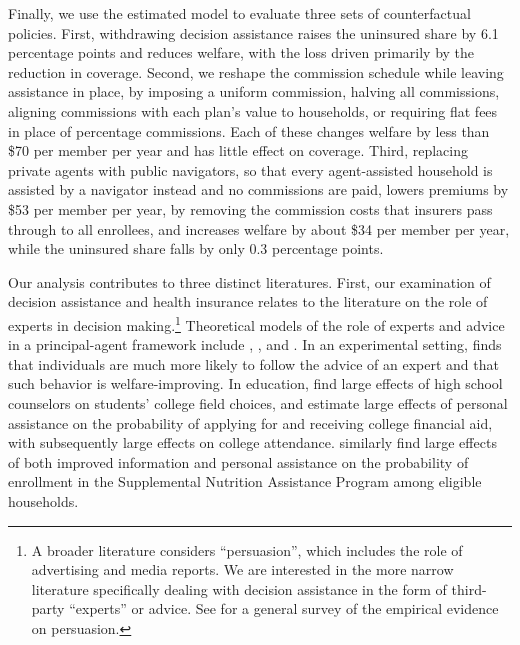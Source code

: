 \documentclass[12pt]{article}
\begin{document}
Finally, we use the estimated model to evaluate three sets of counterfactual policies. First, withdrawing decision assistance raises the uninsured share by 6.1 percentage points and reduces welfare, with the loss driven primarily by the reduction in coverage. Second, we reshape the commission schedule while leaving assistance in place, by imposing a uniform commission, halving all commissions, aligning commissions with each plan's value to households, or requiring flat fees in place of percentage commissions. Each of these changes welfare by less than \$70 per member per year and has little effect on coverage. Third, replacing private agents with public navigators, so that every agent-assisted household is assisted by a navigator instead and no commissions are paid, lowers premiums by \$53 per member per year, by removing the commission costs that insurers pass through to all enrollees, and increases welfare by about \$34 per member per year, while the uninsured share falls by only 0.3 percentage points.


Our analysis contributes to three distinct literatures. First, our examination of decision assistance and health insurance relates to the literature on the role of experts in decision making.\footnote{A broader literature considers ``persuasion'', which includes the role of advertising and media reports. We are interested in the more narrow literature specifically dealing with decision assistance in the form of third-party ``experts'' or advice. See \cite{dellavigna2010} for a general survey of the empirical evidence on persuasion.} Theoretical models of the role of experts and advice in a principal-agent framework include \cite{szalay2005}, \cite{alonso2008}, and \cite{armstrong2010}. In an experimental setting, \cite{schotter2003} finds that individuals are much more likely to follow the advice of an expert and that such behavior is welfare-improving. In education, \cite{borghans2015} find large effects of high school counselors on students' college field choices, and \cite{bettinger2012} estimate large effects of personal assistance on the probability of applying for and receiving college financial aid, with subsequently large effects on college attendance. \cite{finkelstein2019} similarly find large effects of both improved information and personal assistance on the probability of enrollment in the Supplemental Nutrition Assistance Program among eligible households.
\end{document}
